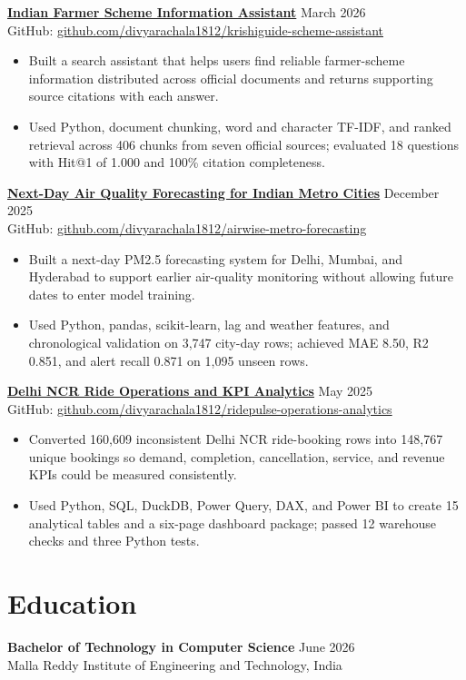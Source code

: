 \documentclass[10pt,a4paper]{article}
\newcommand{\projectheading}[4]{
  \href{#3}{\textbf{#1}} \hfill #2\\
  {\small GitHub: \href{#3}{#4}}\vspace{1pt}
}
\begin{document}
\projectheading{Indian Farmer Scheme Information Assistant}{March 2026}{https://github.com/divyarachala1812/krishiguide-scheme-assistant}{github.com/divyarachala1812/krishiguide-scheme-assistant}
\begin{itemize}
  \item Built a search assistant that helps users find reliable farmer-scheme information distributed across official documents and returns supporting source citations with each answer.
  \item Used Python, document chunking, word and character TF-IDF, and ranked retrieval across 406 chunks from seven official sources; evaluated 18 questions with Hit@1 of 1.000 and 100\% citation completeness.
\end{itemize}

\projectheading{Next-Day Air Quality Forecasting for Indian Metro Cities}{December 2025}{https://github.com/divyarachala1812/airwise-metro-forecasting}{github.com/divyarachala1812/airwise-metro-forecasting}
\begin{itemize}
  \item Built a next-day PM2.5 forecasting system for Delhi, Mumbai, and Hyderabad to support earlier air-quality monitoring without allowing future dates to enter model training.
  \item Used Python, pandas, scikit-learn, lag and weather features, and chronological validation on 3,747 city-day rows; achieved MAE 8.50, R2 0.851, and alert recall 0.871 on 1,095 unseen rows.
\end{itemize}

\projectheading{Delhi NCR Ride Operations and KPI Analytics}{May 2025}{https://github.com/divyarachala1812/ridepulse-operations-analytics}{github.com/divyarachala1812/ridepulse-operations-analytics}
\begin{itemize}
  \item Converted 160,609 inconsistent Delhi NCR ride-booking rows into 148,767 unique bookings so demand, completion, cancellation, service, and revenue KPIs could be measured consistently.
  \item Used Python, SQL, DuckDB, Power Query, DAX, and Power BI to create 15 analytical tables and a six-page dashboard package; passed 12 warehouse checks and three Python tests.
\end{itemize}

\section*{Education}
\textbf{Bachelor of Technology in Computer Science} \hfill June 2026\\
Malla Reddy Institute of Engineering and Technology, India
\end{document}

